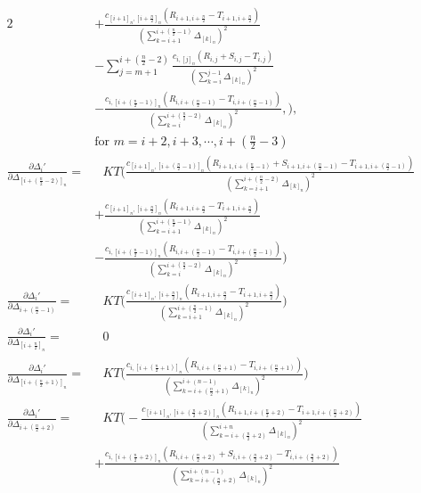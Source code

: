 \begin{alignat}{2}
 &+ \frac{c_{[i+1]_n,[i+\frac{n}{2}]_n}(R_{i+1,i+\frac{n}{2}} - T_{i+1,i+\frac{n}{2}})}{(\sum_{k=i+1}^{i+(\frac{n}{2}-1)}\Delta_{[k]_n})^2} \nonumber \\
 &- \sum_{j= m+1}^{i+(\frac{n}{2}-2)}  \frac{c_{i,[j]_n}(R_{i,j} + S_{i,j} - T_{i,j})}{(\sum_{k=i}^{j-1}\Delta_{[k]_n})^2} \nonumber \\
 &- \frac{c_{i,[i+(\frac{n}{2}-1)]_n}(R_{i,i+(\frac{n}{2}-1)} - T_{i,i+(\frac{n}{2}-1)})}{(\sum_{k=i}^{i+(\frac{n}{2}-2)}\Delta_{[k]_n})^2}, \Bigg), \nonumber \\
 &\text{for } m = i+2, i+3, \cdots, i + (\frac{n}{2} - 3) \nonumber \\
\frac{\partial \Delta_i'}{\partial \Delta_{[i+(\frac{n}{2}-2)]_n}} =& \text{ }KT \Bigg( \frac{c_{[i+1]_n,[i+(\frac{n}{2}-1)]_n}(R_{i+1,i+(\frac{n}{2}-1)} + S_{i+1,i+(\frac{n}{2}-1)} - T_{i+1,i+(\frac{n}{2}-1)})}{(\sum_{k=i+1}^{i+(\frac{n}{2}-2)}\Delta_{[k]_n})^2} \nonumber \\
 &+ \frac{c_{[i+1]_n,[i+\frac{n}{2}]_n}(R_{i+1,i+\frac{n}{2}} - T_{i+1,i+\frac{n}{2}})}{(\sum_{k=i+1}^{i+(\frac{n}{2}-1)}\Delta_{[k]_n})^2} \nonumber \\
  &- \frac{c_{i,[i+(\frac{n}{2}-1)]_n}(R_{i,i+(\frac{n}{2}-1)} - T_{i,i+(\frac{n}{2}-1)})}{(\sum_{k=i}^{i+(\frac{n}{2}-2)}\Delta_{[k]_n})^2} \Bigg) \nonumber \\
\frac{\partial \Delta_i'}{\partial \Delta_{i+(\frac{n}{2}-1)}} =& \text{ } KT \Bigg( \frac{c_{[i+1]_n,[i+\frac{n}{2}]_n}(R_{i+1,i+\frac{n}{2}} - T_{i+1,i+\frac{n}{2}})}{(\sum_{k=i+1}^{i+(\frac{n}{2}-1)}\Delta_{[k]_n})^2} \Bigg) \nonumber \ \\
\frac{\partial \Delta_i'}{\partial \Delta_{[i+\frac{n}{2}]_n}} =& \text{ }0 \nonumber \\
\frac{\partial \Delta_i'}{\partial \Delta_{[i+(\frac{n}{2}+1)]_n}} =& \text{ } KT \Bigg( \frac{c_{i,[i+(\frac{n}{2}+1)]_n}(R_{i,i+(\frac{n}{2}+1)} - T_{i,i+(\frac{n}{2}+1)})}{(\sum_{k=i+(\frac{n}{2}+1)}^{i+(n-1)}\Delta_{[k]_n})^2} \Bigg) \nonumber \\
\frac{\partial \Delta_i'}{\partial \Delta_{i+(\frac{n}{2}+2)}} =& \text{ }KT \Bigg( - \frac{c_{[i+1]_n,[i+(\frac{n}{2}+2)]_n}(R_{i+1,i+(\frac{n}{2}+2)} - T_{i+1,i+(\frac{n}{2}+2)})}{(\sum_{k=i+(\frac{n}{2}+2)}^{i+n}\Delta_{[k]_n})^2} \nonumber \\
 &+ \frac{c_{i,[i+(\frac{n}{2}+2)]_n}(R_{i,i+(\frac{n}{2}+2)} + S_{i,i+(\frac{n}{2}+2)} - T_{i,i+(\frac{n}{2}+2)})}{(\sum_{k=i+(\frac{n}{2}+2)}^{i+(n-1)}\Delta_{[k]_n})^2} \nonumber \\

\end{alignat}
